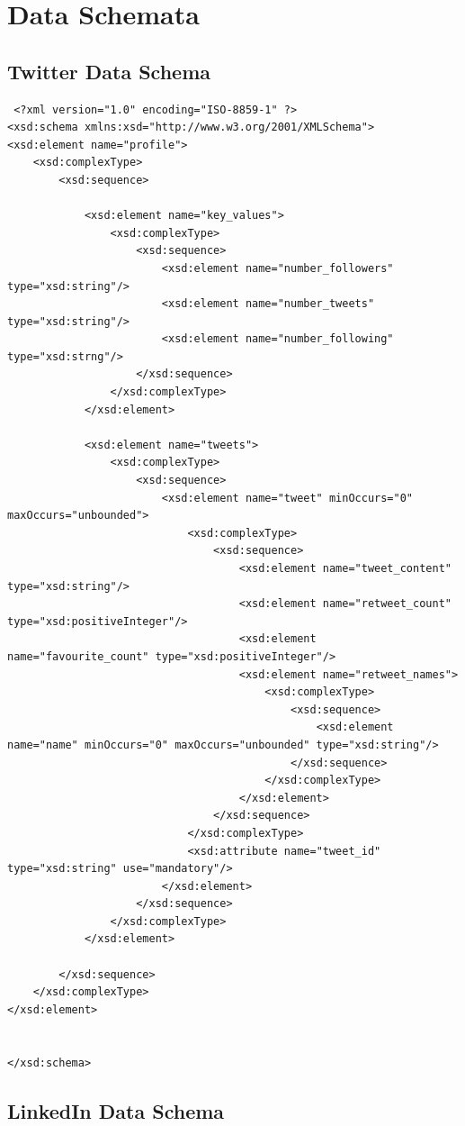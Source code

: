 \chapter{Data Schemata}\label{C:us}

\section{Twitter Data Schema}

\begin{verbatim}
 <?xml version="1.0" encoding="ISO-8859-1" ?>
<xsd:schema xmlns:xsd="http://www.w3.org/2001/XMLSchema">
<xsd:element name="profile">
	<xsd:complexType>
		<xsd:sequence>

			<xsd:element name="key_values">
				<xsd:complexType>
					<xsd:sequence>
						<xsd:element name="number_followers" type="xsd:string"/>
						<xsd:element name="number_tweets" type="xsd:string"/>
						<xsd:element name="number_following" type="xsd:strng"/>
					</xsd:sequence>
				</xsd:complexType>
			</xsd:element>

			<xsd:element name="tweets">
				<xsd:complexType>
					<xsd:sequence>
						<xsd:element name="tweet" minOccurs="0" maxOccurs="unbounded">
							<xsd:complexType>
								<xsd:sequence>
									<xsd:element name="tweet_content" type="xsd:string"/>
									<xsd:element name="retweet_count" type="xsd:positiveInteger"/>
									<xsd:element name="favourite_count" type="xsd:positiveInteger"/>
									<xsd:element name="retweet_names">
										<xsd:complexType>
											<xsd:sequence>
												<xsd:element name="name" minOccurs="0" maxOccurs="unbounded" type="xsd:string"/>
											</xsd:sequence>
										</xsd:complexType>
									</xsd:element>
								</xsd:sequence>
							</xsd:complexType>
							<xsd:attribute name="tweet_id" type="xsd:string" use="mandatory"/>
						</xsd:element>
					</xsd:sequence>
				</xsd:complexType>
			</xsd:element>

		</xsd:sequence>
	</xsd:complexType>
</xsd:element>	


</xsd:schema>
\end{verbatim}

\section{LinkedIn Data Schema}

